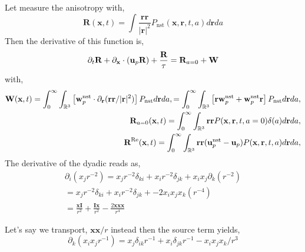 Let measure the anisotropy with, 
\begin{equation*}
    \textbf{R}(\textbf{x},t)
    = \int \frac{\textbf{rr}}{|\textbf{r}|^2} P_\text{nst}(\textbf{x},\textbf{r},t,a) d\textbf{r} da
\end{equation*}
Then the derivative of this function is, 
\begin{equation*}
    \partial_t \textbf{R}
    + \partial_\textbf{x}\cdot (\textbf{u}_p \textbf{R})
    + \frac{\textbf{R}}{\tau}
    = \textbf{R}_{a=0}
    + \textbf{W}
\end{equation*}
with, 
\begin{align*}
    \textbf{W}(\textbf{x},t) = 
    \int_{0}^\infty
    \int_{\mathbb{R}^3} \left[
         \textbf{w}^\text{nst}_p \cdot \partial_\textbf{r} (\textbf{rr}/|\textbf{r}|^2)
    \right]P_\text{nst}
    d\textbf{r}
    da,
    = \int_{0}^\infty
    \int_{\mathbb{R}^3} \left[
        \textbf{r} \textbf{w}^\text{nst}_p
        + \textbf{w}^\text{nst}_p\textbf{r}
    \right]P_\text{nst}
    d\textbf{r}
    da,
    \\
    \textbf{R}_{a = 0}(\textbf{x},t)
    =
    \int_{0}^\infty
    \int_{\mathbb{R}^3}
    \textbf{rr}
    P(\textbf{x},\textbf{r},t,a=0)\delta(a)
    d\textbf{r}da, \\
    \textbf{R}^\text{Re}(\textbf{x},t)
    =
    \int_{0}^\infty
    \int_{\mathbb{R}^3}
    \textbf{rr}(\textbf{u}^\text{nst}_p - \textbf{u}_p)
    P(\textbf{x},\textbf{r},t,a)
    d\textbf{r}da, 
\end{align*} 
The derivative of the dyadic reads as, 
\begin{align*}
    \partial_i (x_jr^{-2})
    = 
    x_jr^{-2} \delta_{ki}
    + x_ir^{-2} \delta_{jk}
    + x_ix_j \partial_k (r^{-2})\\
    = 
    x_jr^{-2} \delta_{ki}
    + x_ir^{-2} \delta_{jk}
    + -2 x_ix_jx_k (r^{-4})\\
    = \frac{\textbf{xI}}{r^2}
    + \frac{\textbf{Ix}}{r^2}
    - \frac{2 \textbf{xxx}}{r^4}
\end{align*}

Let's say we transport, $\textbf{xx}/r$ instead then the source term yields, 
\begin{equation}
    \partial_k (x_i x_j r^{-1})
    = 
    x_j \delta_{ik} r^{-1}
    + x_i \delta_{jk} r^{-1}
    - x_ix_jx_k/r^3
\end{equation}


